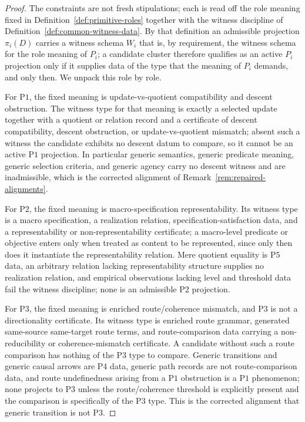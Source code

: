 \documentclass[11pt]{article}
\theoremstyle{definition}
\newcommand{\Pone}{\ensuremath{\mathrm{P1}}}
\newcommand{\Ptwo}{\ensuremath{\mathrm{P2}}}
\newcommand{\Pthree}{\ensuremath{\mathrm{P3}}}
\newcommand{\Pfour}{\ensuremath{\mathrm{P4}}}
\newcommand{\Pfive}{\ensuremath{\mathrm{P5}}}
\begin{document}
\begin{proof}
The constraints are not fresh stipulations; each is read off the role
meaning fixed in Definition~\ref{def:primitive-roles} together with the
witness discipline of Definition~\ref{def:common-witness-data}. By that
definition an admissible projection \(\pi_i(D)\) carries a witness schema
\(W_i\) that is, by requirement, the witness schema for the role meaning
of \(P_i\); a candidate cluster therefore qualifies as an active \(P_i\)
projection only if it supplies data of the type that the meaning of
\(P_i\) demands, and only then. We unpack this role by role.

For \Pone{}, the fixed meaning is update-vs-quotient compatibility and
descent obstruction. The witness type for that meaning is exactly a
selected update together with a quotient or relation record and a
certificate of descent compatibility, descent obstruction, or
update-vs-quotient mismatch; absent such a witness the candidate
exhibits no descent datum to compare, so it cannot be an active \Pone{}
projection. In particular generic semantics, generic predicate meaning,
generic selection criteria, and generic agency carry no descent witness
and are inadmissible, which is the corrected alignment of
Remark~\ref{rem:repaired-alignments}.

For \Ptwo{}, the fixed meaning is macro-specification representability.
Its witness type is a macro specification, a realization relation,
specification-satisfaction data, and a representability or
non-representability certificate; a macro-level predicate or objective
enters only when treated as content to be represented, since only then
does it instantiate the representability relation. Mere quotient
equality is \Pfive{} data, an arbitrary relation lacking
representability structure supplies no realization relation, and
empirical observations lacking level and threshold data fail the witness
discipline; none is an admissible \Ptwo{} projection.

For \Pthree{}, the fixed meaning is enriched route/coherence mismatch,
and \Pthree{} is not a directionality certificate. Its witness type is
enriched route grammar, generated same-source same-target route terms,
and route-comparison data carrying a non-reducibility or
coherence-mismatch certificate. A candidate without such a route
comparison has nothing of the \Pthree{} type to compare. Generic
transitions and generic causal arrows are \Pfour{} data, generic path
records are not route-comparison data, and route undefinedness arising
from a \Pone{} obstruction is a \Pone{} phenomenon; none projects to
\Pthree{} unless the route/coherence threshold is explicitly present and
the comparison is specifically of the \Pthree{} type. This is the
corrected alignment that generic transition is not \Pthree{}.


\end{proof}
\end{document}
